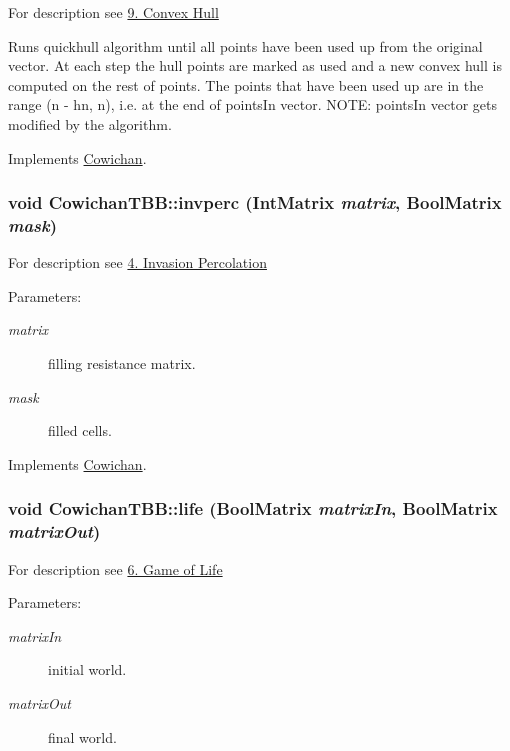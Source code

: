 For description see \hyperlink{index_hull_sec}{9. Convex Hull}

Runs quickhull algorithm until all points have been used up from the original vector. At each step the hull points are marked as used and a new convex hull is computed on the rest of points. The points that have been used up are in the range (n - hn, n), i.e. at the end of pointsIn vector. NOTE: pointsIn vector gets modified by the algorithm. 

Implements \hyperlink{class_cowichan_0c6b68ae3c059b66893405f8530a2e0a}{Cowichan}.\hypertarget{class_cowichan_t_b_b_e4f9f8c31feea9b3a167fc2880a97610}{
\subsubsection[{invperc}]{\setlength{\rightskip}{0pt plus 5cm}void CowichanTBB::invperc ({\bf IntMatrix} {\em matrix}, \/  {\bf BoolMatrix} {\em mask})}}
\label{class_cowichan_t_b_b_e4f9f8c31feea9b3a167fc2880a97610}


For description see \hyperlink{index_invperc_sec}{4. Invasion Percolation} \begin{Desc}
\item[Parameters:]
\begin{description}
\item[{\em matrix}]filling resistance matrix. \item[{\em mask}]filled cells. \end{description}
\end{Desc}


Implements \hyperlink{class_cowichan_ea126792a31e54a8722663b7ea768955}{Cowichan}.\hypertarget{class_cowichan_t_b_b_273e3e8a2e05108f59ec613472bfa363}{
\subsubsection[{life}]{\setlength{\rightskip}{0pt plus 5cm}void CowichanTBB::life ({\bf BoolMatrix} {\em matrixIn}, \/  {\bf BoolMatrix} {\em matrixOut})}}
\label{class_cowichan_t_b_b_273e3e8a2e05108f59ec613472bfa363}


For description see \hyperlink{index_life_sec}{6. Game of Life} \begin{Desc}
\item[Parameters:]
\begin{description}
\item[{\em matrixIn}]initial world. \item[{\em matrixOut}]final world. \end{description}
\end{Desc}


